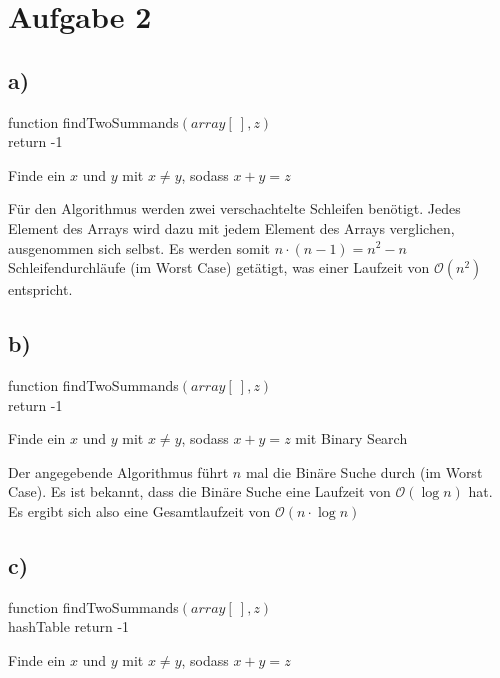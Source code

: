 \documentclass[a4paper]{scrartcl}
\begin{document}
\section*{Aufgabe 2}
\subsection*{a)}

\begin{algorithm}[H]
 function findTwoSummands$(array\left[ ~ \right], z)$ \\
		return -1\;
 \caption{Finde ein $x$ und $y$ mit $x \neq y$, sodass $x + y = z$}
\end{algorithm} 

\vspace{1cm}

Für den Algorithmus werden zwei verschachtelte Schleifen benötigt. Jedes Element des Arrays wird dazu mit jedem Element des Arrays verglichen, ausgenommen sich selbst. Es werden somit $n \cdot (n-1) = n^2 - n$ Schleifendurchläufe (im Worst Case) getätigt, was einer Laufzeit von $\mathcal{O}(n^2)$ entspricht. 

\subsection*{b)}
\begin{algorithm}[H]
 function findTwoSummands$(array\left[ ~ \right], z)$ \\
		return -1\;
 \caption{Finde ein $x$ und $y$ mit $x \neq y$, sodass $x + y = z$ mit Binary Search}
\end{algorithm} 

\vspace{1cm}

Der angegebende Algorithmus führt $n$ mal die Binäre Suche durch (im Worst Case). Es ist bekannt, dass die Binäre Suche eine Laufzeit von $\mathcal{O}(\log n)$ hat. Es ergibt sich also eine Gesamtlaufzeit von $\mathcal{O}(n \cdot \log n)$

\subsection*{c)}
\begin{algorithm}[H]
 function findTwoSummands$(array\left[ ~ \right], z)$ \\
		hashTable\;
		return -1\;
 \caption{Finde ein $x$ und $y$ mit $x \neq y$, sodass $x + y = z$}
\end{algorithm} 
\end{document}
